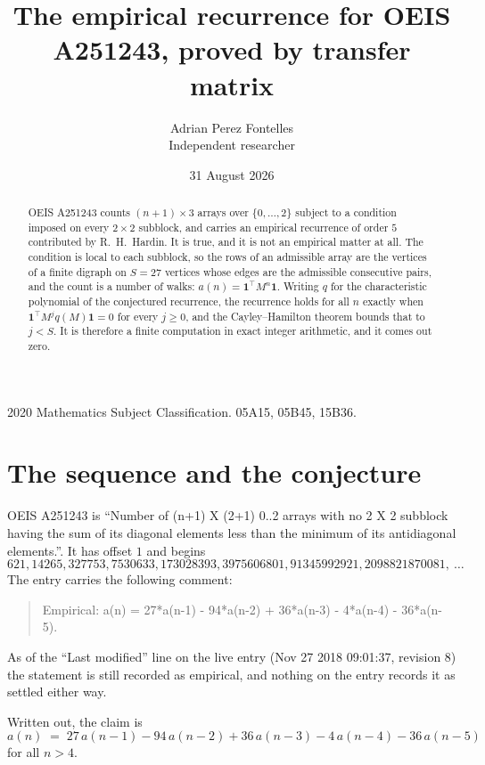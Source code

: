 \documentclass[11pt,a4paper]{article}
\title{The empirical recurrence for OEIS A251243, proved by transfer matrix}
\author{Adrian Perez Fontelles\\ \small Independent researcher}
\date{31 August 2026}
\theoremstyle{plain}
\theoremstyle{definition}
\begin{document}
\maketitle

\begin{abstract}
OEIS A251243 counts $(n+1)\times3$ arrays over $\{0,\dots,2\}$ subject to a condition imposed on
every $2\times2$ subblock, and carries an empirical recurrence of order $5$ contributed
by R.~H.~Hardin. It is true, and it is not an empirical matter at all. The condition is local
to each subblock, so the rows of an admissible array are the vertices of a finite digraph
on $S=27$ vertices whose edges are the admissible consecutive pairs, and the count is a
number of walks: $a(n)=\mathbf{1}^{\!\top}M^{n}\mathbf{1}$. Writing $q$
for the characteristic polynomial of the conjectured recurrence, the recurrence holds for all
$n$ exactly when $\mathbf{1}^{\!\top}M^{j}q(M)\mathbf{1}=0$ for every $j\ge0$, and the
Cayley--Hamilton theorem bounds that to $j<S$. It is therefore a finite computation in exact
integer arithmetic, and it comes out zero.
\end{abstract}

\noindent\small 2020 Mathematics Subject Classification. 05A15, 05B45, 15B36.\normalsize

\section{The sequence and the conjecture}

OEIS A251243 is ``Number of (n+1) X (2+1) 0..2 arrays with no 2 X 2 subblock having the sum of its diagonal elements less than the minimum of its antidiagonal elements.''. It has offset $1$ and begins
\[
621, 14265, 327753, 7530633, 173028393, 3975606801, 91345992921, 2098821870081,\ \dots
\]
The entry carries the following comment:
\begin{quote}\small
Empirical: a(n) = 27*a(n-1) - 94*a(n-2) + 36*a(n-3) - 4*a(n-4) - 36*a(n-5).
\end{quote}
As of the ``Last modified'' line on the live entry (Nov 27 2018 09:01:37, revision 8) the statement is
still recorded as empirical, and nothing on the entry records it as settled either way.

Written out, the claim is
\begin{equation}\label{eq:conj}
a(n)\;=\;27\,a(n-1) - 94\,a(n-2) + 36\,a(n-3) - 4\,a(n-4) - 36\,a(n-5)
\end{equation}
for all $n>4$.
\end{document}
